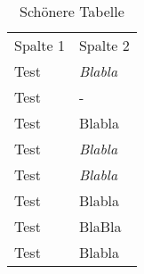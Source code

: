 \begin{table}[H]
        \centering
        \begin{tabular}{|l|l|}
            \rowcolor{blue}
            {\color{white}Spalte 1} &   {\color{white}Spalte 2} \\
            Test    &   \textit{Blabla} \\\hline
            Test    &   -               \\\hline
            Test    &   Blabla          \\\hline
            Test    &   \textit{Blabla} \\\hline
            Test    &   \textit{Blabla} \\\hline
            Test    &   Blabla          \\\hline
            Test    &   BlaBla          \\\hline
            Test    &   Blabla          \\\hline
        \end{tabular}
        \caption{Schönere Tabelle}
        \label{Schönere Tabelle}
    \end{table}
